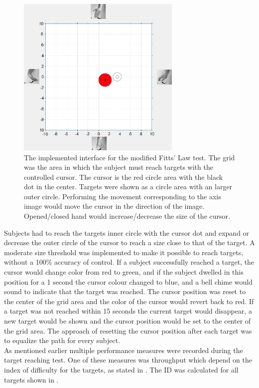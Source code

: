 \begin{figure}[H] 
	\includegraphics[width=0.7\textwidth]{figures/xBackground/perftestGUI}
	\caption{The implemented interface for the modified Fitts' Law test. The grid was the area in which the subject must reach targets with the controlled cursor. The cursor is the red circle area with the black dot in the center. Targets were shown as a circle area with an larger outer circle. Performing the movement corresponding to the axis image would move the cursor in the direction of the image. Opened/closed hand would increase/decrease the size of the cursor.}
	\label{fig:fittsLawTask}
\end{figure}

Subjects had to reach the targets inner circle with the cursor dot and expand or decrease the outer circle of the cursor to reach a size close to that of the target. A moderate size threshold was implemented to make it possible to reach targets, without a 100\% accuracy of control. If a subject successfully reached a target, the cursor would change color from red to green, and if the subject dwelled in this position for a 1 second the cursor colour changed to blue, and a bell chime would sound to indicate that the target was reached. The cursor position was reset to the center of the grid area and the color of the cursor would revert back to red. If a target was not reached within 15 seconds the current target would disappear, a new target would be shown and the cursor position would be set to the center of the grid area. The approach of resetting the cursor position after each target was to equalize the path for every subject. \\
As mentioned earlier multiple performance measures were recorded during the target reaching test. One of these measures was throughput which depend on the index of difficulty for the targets, as stated in . The ID was calculated for all targets shown in . 

